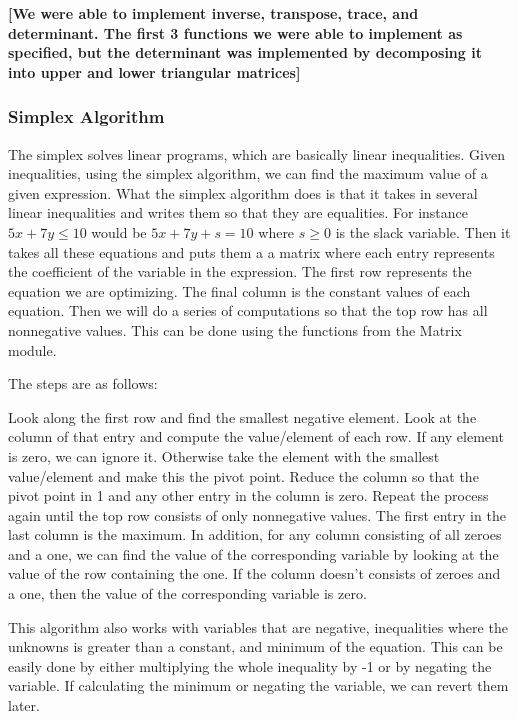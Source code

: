 \documentclass[letterpaper,11pt]{article}
\newcommand{\annot}[1]{\textbf{\color{BrickRed} [#1]}}
\begin{document}
{\annot{We were able to implement inverse, transpose, trace, and determinant.
The first 3 functions we were able to implement as specified, but the
determinant was implemented by decomposing it into upper and lower triangular
matrices}}

\subsubsection{Simplex Algorithm}

The simplex solves linear programs, which are basically linear inequalities.
Given inequalities, using the simplex algorithm, we can find the maximum value
of a given expression. What the simplex algorithm does is that it takes in
several linear inequalities and writes them so that they are equalities. For
instance $5x + 7y \leq 10$ would be $5x + 7y + s = 10$ where $s \geq 0$ is the
slack variable. Then it takes all these equations and puts them a a matrix where
each entry represents the coefficient of the variable in the expression. The
first row represents the equation we are optimizing. The final column is the
constant values of each equation. Then we will do a series of computations so
that the top row has all nonnegative values. This can be done using the
functions from the Matrix module. 

The steps are as follows:

Look along the first row and find the smallest negative element. Look at the
column of that entry and compute the value/element of each row. If any element
is zero, we can ignore it. Otherwise take the element with the smallest
value/element and make this the pivot point. Reduce the column so that the pivot
point in 1 and any other entry in the column is zero. Repeat the process again
until the top row consists of only nonnegative values. The first entry in the
last column is the maximum. In addition, for any column consisting of all zeroes
and a one, we can find the value of the corresponding variable by looking at the
value of the row containing the one. If the column doesn’t consists of zeroes
and a one, then the value of the corresponding variable is zero. 

This algorithm also works with variables that are negative, inequalities where
the unknowns is greater than a constant, and minimum of the equation. This can
be easily done by either multiplying the whole inequality by -1 or by negating
the variable. If calculating the minimum or negating the variable, we can revert
them later.  
\end{document}
